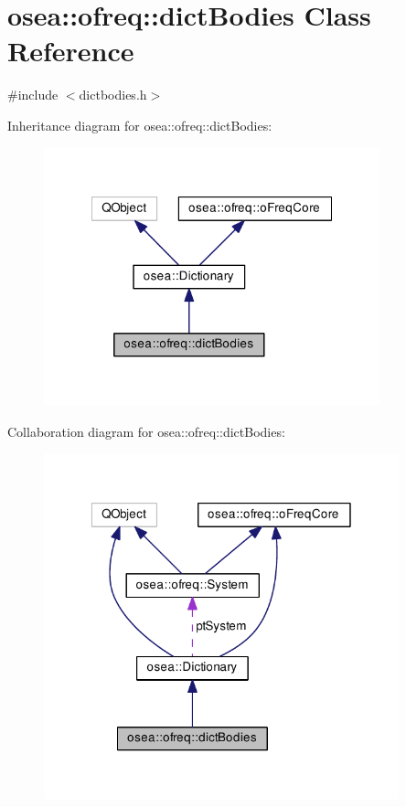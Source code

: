 \hypertarget{classosea_1_1ofreq_1_1dict_bodies}{\section{osea\-:\-:ofreq\-:\-:dict\-Bodies Class Reference}
\label{classosea_1_1ofreq_1_1dict_bodies}
}


{\ttfamily \#include $<$dictbodies.\-h$>$}



Inheritance diagram for osea\-:\-:ofreq\-:\-:dict\-Bodies\-:\nopagebreak
\begin{figure}[H]
\begin{center}
\leavevmode
\includegraphics[width=275pt]{classosea_1_1ofreq_1_1dict_bodies__inherit__graph}
\end{center}
\end{figure}


Collaboration diagram for osea\-:\-:ofreq\-:\-:dict\-Bodies\-:\nopagebreak
\begin{figure}[H]
\begin{center}
\leavevmode
\includegraphics[width=291pt]{classosea_1_1ofreq_1_1dict_bodies__coll__graph}
\end{center}
\end{figure}
